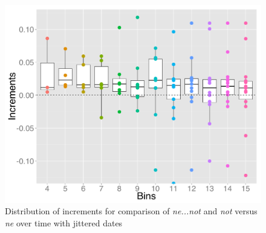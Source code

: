 \begin{figure}
\centering
     \includegraphics[width=\textwidth]{jitter-lump-first-increments.pdf}
\caption{Distribution of increments for  comparison of \textit{\color{blue} ne...not} and \textit{\color{green} not}  versus  \textit{\color{red}  ne} over time with jittered dates}
\label{jitter-lump-first-increments}
\end{figure}





%
%


